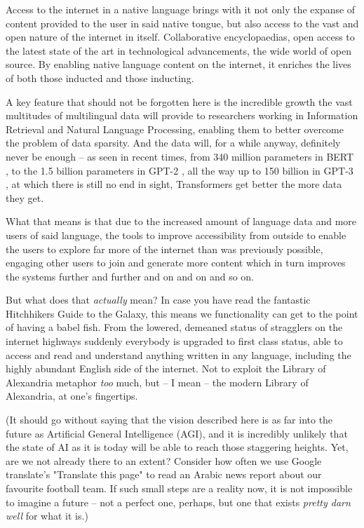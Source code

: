 \documentclass[11pt]{article}
\begin{document}
Access to the internet in a native language brings with it not only the expanse
of content provided to the user in said native tongue, but also access to the
vast and open nature of the internet in itself. Collaborative encyclopaedias,
open access to the latest state of the art in technological advancements, the
wide world of open source. By enabling native language content on the internet,
it enriches the lives of both those inducted and those inducting.

A key feature that should not be forgotten here is the incredible growth the
vast multitudes of multilingual data will provide to researchers working in
Information Retrieval and Natural Language Processing, enabling them to better
overcome the problem of data sparsity. And the data will, for a while anyway,
definitely never be enough -- as seen in recent times, from 340 million
parameters in BERT \cite{devlin_bert_2019}, to the 1.5 billion parameters in
GPT-2 \cite{radford_language_2019}, all the way up to 150 billion in GPT-3
\cite{brown_language_2020}, at which there is still no end in sight,
Transformers get better the more data they get.

What that means is that due to the increased amount of language data and more
users of said language, the tools to improve accessibility from outside to
enable the users to explore far more of the internet than was previously
possible, engaging other users to join and generate more content which in turn
improves the systems further and further and on and on and so on.

But what does that \textit{actually} mean? In case you have read the fantastic
Hitchhikers Guide to the Galaxy, this means we functionality can get to the
point of having a babel fish. From the lowered, demeaned status of stragglers on
the internet highways suddenly everybody is upgraded to first class status, able
to access and read and understand anything written in any language, including
the highly abundant English side of the internet. Not to exploit the Library of
Alexandria metaphor \textit{too} much, but -- I mean -- the modern Library of
Alexandria, at one's fingertips.

(It should go without saying that the vision described here is as far into the
future as Artificial General Intelligence (AGI), and it is incredibly unlikely
that the state of AI as it is today will be able to reach those staggering
heights. Yet, are we not already there to an extent? Consider how often we use
Google translate's "Translate this page" to read an Arabic news report about our
favourite football team. If such small steps are a reality now, it is not
impossible to imagine a future -- not a perfect one, perhaps, but one that
exists \textit{pretty darn well} for what it is.)
\end{document}
